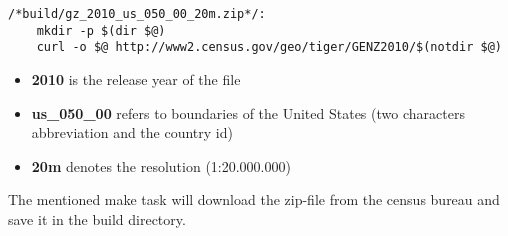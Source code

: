 \begin{lstlisting}[style={makefile}, caption={Make task for downloading cartographic boundaries}, label={lst:data-acqu-zip}]
/*build/gz_2010_us_050_00_20m.zip*/:
    mkdir -p $(dir $@)
    curl -o $@ http://www2.census.gov/geo/tiger/GENZ2010/$(notdir $@)
\end{lstlisting}

\begin{itemize}
\item \textbf{2010} is the release year of the file
\item \textbf{us\_050\_00} refers to boundaries of the United States (two characters abbreviation and the country id)
\item \textbf{20m} denotes the resolution (1:20.000.000)
\end{itemize}

The mentioned make task will download the zip-file from the census bureau and save it in the build directory.

